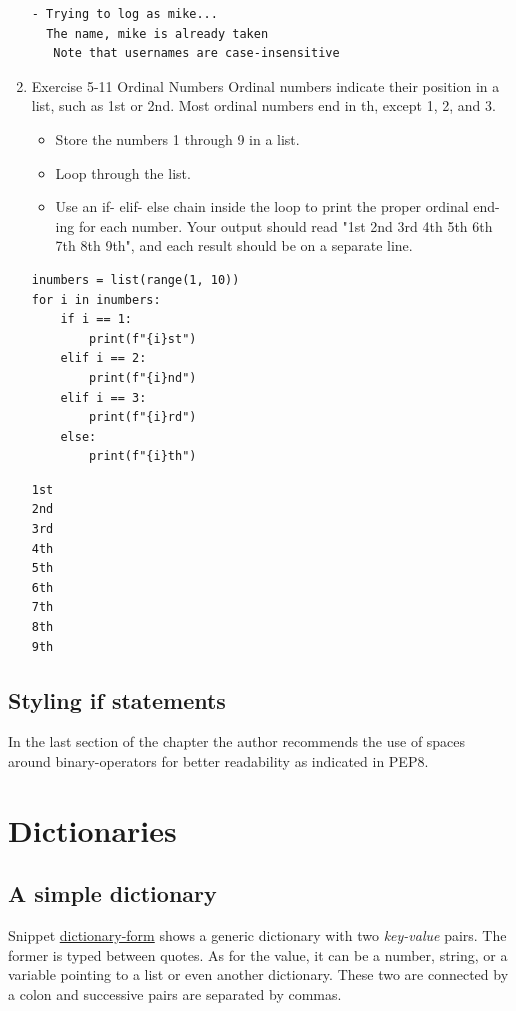 \documentclass[10pt]{book}
\begin{document}
\begin{enumerate}
\begin{verbatim}
- Trying to log as mike...
  The name, mike is already taken
   Note that usernames are case-insensitive
\end{verbatim}
\item Exercise 5-11 Ordinal Numbers
\label{sec:org0457198}
Ordinal numbers indicate their position in a list, such as 1st or 2nd. Most ordinal numbers end in th, except 1, 2, and 3.
\begin{itemize}
\item Store the numbers 1 through 9 in a list.
\item Loop through the list.
\item Use an if- elif- else chain inside the loop to print the proper ordinal end- ing for each number. Your output should read "1st 2nd 3rd 4th 5th 6th 7th 8th 9th", and each result should be on a separate line.
\end{itemize}
\begin{verbatim}
inumbers = list(range(1, 10))
for i in inumbers:
    if i == 1:
        print(f"{i}st")
    elif i == 2:
        print(f"{i}nd")
    elif i == 3:
        print(f"{i}rd")
    else:
        print(f"{i}th")
\end{verbatim}

\label{orga50489b}
\begin{verbatim}
1st
2nd
3rd
4th
5th
6th
7th
8th
9th
\end{verbatim}
\end{enumerate}
\section{Styling if statements}
\label{sec:orge13a88f}
In the last section of the chapter the author recommends the use of spaces around binary-operators for better readability as indicated in PEP8.
\chapter{Dictionaries}
\label{sec:org1ab4b50}
\section{A simple dictionary}
\label{sec:orga5e60a2}
Snippet \hyperref[lst:org7f07fb0]{dictionary-form} shows a generic dictionary with two \emph{key-value} pairs. The former is typed between quotes. As for the value, it can be a number, string, or a variable pointing to a list or even another dictionary. These two are connected by a colon and successive pairs are separated by commas.
\end{document}
